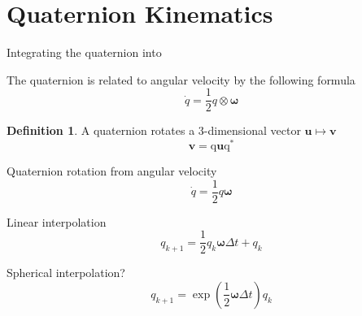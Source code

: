 \documentclass{amsart}
\theoremstyle{definition}
\newtheorem{definition}[theorem]{Definition}
\theoremstyle{remark}
\numberwithin{equation}{section}
\begin{document}
\section*{Quaternion Kinematics}
Integrating the quaternion into

The quaternion is related to angular velocity by the following formula
\begin{equation}
  \dot{q} = \frac{1}{2} q \otimes \boldsymbol\omega
\end{equation}
%
\begin{definition}
  A quaternion rotates a 3-dimensional vector $\mathbf{u} \mapsto \mathbf{v}$
  \begin{equation}
    \mathbf{v} = \mathrm{q}\mathbf{u}\mathrm{q}^*
  \end{equation}
\end{definition}

Quaternion rotation from angular velocity
\begin{equation}
  \dot{q} = \frac{1}{2} q\boldsymbol\omega
\end{equation}

Linear interpolation
\begin{equation}
  q_{k+1} = \frac{1}{2}q_k\boldsymbol\omega\Delta t + q_k 
\end{equation}

Spherical interpolation?
\begin{equation}
  q_{k+1} = \exp\left(\frac{1}{2} \boldsymbol\omega\Delta t\right)q_k
\end{equation}
\end{document}
